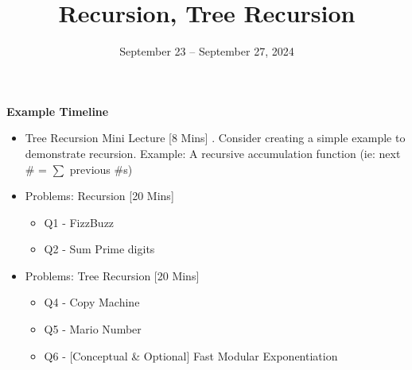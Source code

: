 \documentclass{exam}
\title{Recursion, Tree Recursion}
\date{September 23 -- September 27, 2024}
\begin{document}
\maketitle

\begin{meta}
    \textbf{Example Timeline}
    \begin{itemize}
        \item Tree Recursion Mini Lecture [8 Mins]
            . Consider creating a simple example to demonstrate recursion. Example: A recursive accumulation function (ie: next \# = $\sum$ previous \#s)
        \item Problems: Recursion [20 Mins]
        \begin{itemize}
            \item Q1 - FizzBuzz
            \item Q2 - Sum Prime digits
        \end{itemize}
        \item Problems: Tree Recursion [20 Mins]
        \begin{itemize}
            \item Q4 - Copy Machine
            \item Q5 - Mario Number
            \item Q6 - [Conceptual \& Optional] Fast Modular Exponentiation
        \end{itemize}
        
    \end{itemize}
\end{meta}
\end{document}
